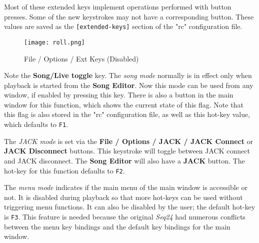    Most of these extended keys implement operations performed with button
   presses.  Some of the new keystrokes may not have a corresponding
   button.
   These values are saved as the \texttt{[extended-keys]} section of the "rc"
   configuration file.

\begin{figure}[H]
   \centering 
   \texttt{[image: roll.png]}
   \caption{File / Options / Ext Keys (Disabled)}
   \label{fig:seq66_menu_file_options_ext_keys_disabled}
\end{figure}

   Note the \textbf{Song/Live toggle} key.
   The \textsl{song mode} normally is in effect only when playback is started
   from the \textbf{Song Editor}.  Now this mode can be used from any
   window, if enabled by pressing this key.  There is also
   a button in the main window for this function, which shows the current state
   of this flag.  Note that this flag is also stored in the "rc" configuration
   file, as well as this hot-key value, which defaults to \texttt{F1}.

   The \textsl{JACK mode} is set via the
   \textbf{File / Options / JACK / JACK Connect} or 
   \textbf{JACK Disconnect} buttons.
   This keystroke will toggle between JACK connect and JACK disconnect.
   The \textbf{Song Editor} will also have a \textbf{JACK} button.
   The hot-key for this function defaults to \texttt{F2}.

   The \textsl{menu mode} indicates if the main menu of the
   main window is accessible or not.  It is disabled during playback
   so that more hot-keys can be used without triggering menu functions.
   It can also be disabled by the user; the default hot-key is \texttt{F3}.
   This feature is needed because the original \textsl{Seq24} had numerous
   conflicts between the menu key bindings and the default key bindings for the
   main window.


